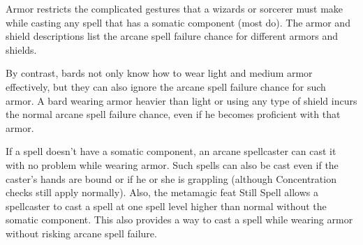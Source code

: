 Armor restricts the complicated gestures that a wizards or sorcerer must make while casting any spell that has a somatic component (most do). The armor and shield descriptions list the arcane spell failure chance for different armors and shields.

By contrast, bards not only know how to wear light and medium armor effectively, but they can also ignore the arcane spell failure chance for such armor. A bard wearing armor heavier than light or using any type of shield incurs the normal arcane spell failure chance, even if he becomes proficient with that armor.

If a spell doesn't have a somatic component, an arcane spellcaster can cast it with no problem while wearing armor. Such spells can also be cast even if the caster's hands are bound or if he or she is grappling (although Concentration checks still apply normally). Also, the metamagic feat Still Spell allows a spellcaster to cast a spell at one spell level higher than normal without the somatic component. This also provides a way to cast a spell while wearing armor without risking arcane spell failure.


